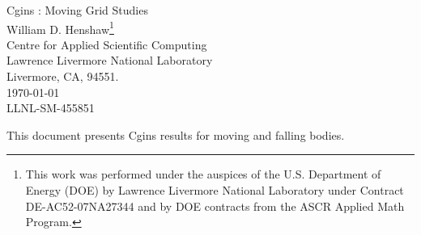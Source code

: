 \documentclass{article}
\begin{document}


\newcommand{\tauv}{\boldsymbol{\tau}}
\newcommand{\sumi}{\sum_{i=1}^n}
\newcommand{\dt}{{\Delta t}}

\newcommand{\Cc}{{\mathcal C}}
\newcommand{\Rc}{{\mathcal R}}

\baselineskip
\begin{flushleft}
{\Large
Cgins : Moving Grid Studies \\
}
\vspace{2\baselineskip}
William D. Henshaw\footnote{This work was performed under the auspices of the U.S. Department of Energy (DOE) by
Lawrence Livermore National Laboratory under Contract DE-AC52-07NA27344 and by 
DOE contracts from the ASCR Applied Math Program.}  \\
Centre for Applied Scientific Computing  \\
Lawrence Livermore National Laboratory      \\
Livermore, CA, 94551.  \\
\vspace{\baselineskip}
\today\\
\vspace{\baselineskip}
LLNL-SM-455851

\vspace{4\baselineskip}

This document presents Cgins results for moving and falling bodies.


\end{flushleft}

\clearpage
\tableofcontents

\clearpage


\clearpage


\clearpage


%
%

\end{document}
